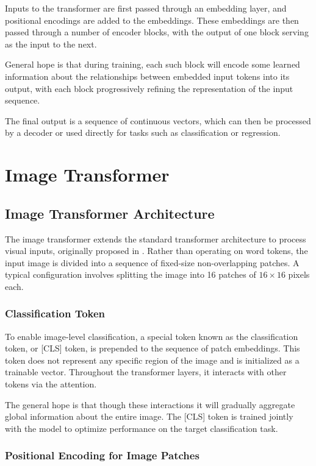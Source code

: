 \documentclass{pracalicmgr}
\begin{document}
Inputs to the transformer are first passed through an embedding layer, and positional encodings are added to the embeddings. These embeddings are then passed through a number of encoder blocks, with the output of one block serving as the input to the next.

General hope is that during training, each such block will encode some learned information about the relationships between embedded input tokens into its output, with each block progressively refining the representation of the input sequence.

The final output is a sequence of continuous vectors, which can then be processed by a decoder or used directly for tasks such as classification or regression.

\section{Image Transformer}

\subsection{Image Transformer Architecture}

The image transformer extends the standard transformer architecture to process visual inputs, originally proposed in \cite{ViT}. Rather than operating on word tokens, the input image is divided into a sequence of fixed-size non-overlapping patches. A typical configuration involves splitting the image into 16 patches of \(16 \times 16\) pixels each. 

\subsubsection{Classification Token}

To enable image-level classification, a special token known as the classification token, or [CLS] token, is prepended to the sequence of patch embeddings. This token does not represent any specific region of the image and is initialized as a trainable vector. Throughout the transformer layers, it interacts with other tokens via the attention.

The general hope is that though these interactions it will gradually aggregate global information about the entire image. The [CLS] token is trained jointly with the model to optimize performance on the target classification task.

\subsubsection{Positional Encoding for Image Patches}
\end{document}
